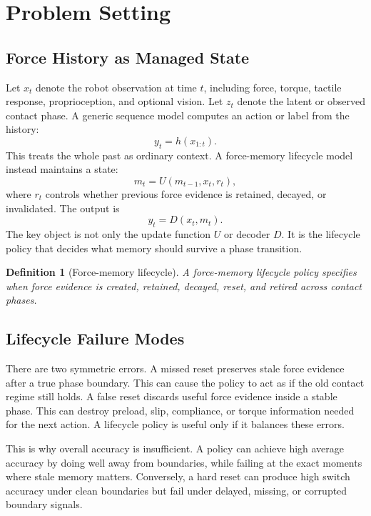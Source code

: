 \documentclass{article}
\newtheorem{definition}{Definition}
\newcommand{\memory}{m}
\newcommand{\reset}{r}
\newcommand{\phase}{z}
\newcommand{\obs}{x}
\begin{document}
\section{Problem Setting}

\subsection{Force History as Managed State}

Let $\obs_t$ denote the robot observation at time $t$, including force, torque,
tactile response, proprioception, and optional vision. Let $\phase_t$ denote the
latent or observed contact phase. A generic sequence model computes an action or
label from the history:
\begin{equation}
    y_t = h(\obs_{1:t}).
\end{equation}
This treats the whole past as ordinary context. A force-memory lifecycle model
instead maintains a state:
\begin{equation}
    \memory_t = U(\memory_{t-1}, \obs_t, \reset_t),
\end{equation}
where $\reset_t$ controls whether previous force evidence is retained, decayed,
or invalidated. The output is
\begin{equation}
    y_t = D(\obs_t, \memory_t).
\end{equation}
The key object is not only the update function $U$ or decoder $D$. It is the
lifecycle policy that decides what memory should survive a phase transition.

\begin{definition}[Force-memory lifecycle]
A force-memory lifecycle policy specifies when force evidence is created,
retained, decayed, reset, and retired across contact phases.
\end{definition}

\subsection{Lifecycle Failure Modes}

There are two symmetric errors. A missed reset preserves stale force evidence
after a true phase boundary. This can cause the policy to act as if the old
contact regime still holds. A false reset discards useful force evidence inside
a stable phase. This can destroy preload, slip, compliance, or torque
information needed for the next action. A lifecycle policy is useful only if it
balances these errors.

This is why overall accuracy is insufficient. A policy can achieve high average
accuracy by doing well away from boundaries, while failing at the exact moments
where stale memory matters. Conversely, a hard reset can produce high switch
accuracy under clean boundaries but fail under delayed, missing, or corrupted
boundary signals.
\end{document}
